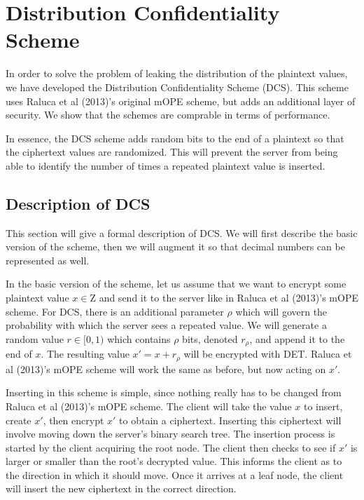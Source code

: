 \documentclass[12pt]{article}
\begin{document}
\section{Distribution Confidentiality Scheme}

In order to solve the problem of leaking the distribution of the plaintext values, we have developed the Distribution Confidentiality Scheme (DCS). This scheme uses Raluca et al (2013)'s original mOPE scheme, but adds an additional layer of security. We show that the schemes are comprable in terms of performance.

In essence, the DCS scheme adds random bits to the end of a plaintext so that the ciphertext values are randomized. This will prevent the server from being able to identify the number of times a repeated plaintext value is inserted.

\subsection{Description of DCS}

This section will give a formal description of DCS. We will first describe the basic version of the scheme, then we will augment it so that decimal numbers can be represented as well.

In the basic version of the scheme, let us assume that we want to encrypt some plaintext value $x \in \mathrm{Z}$ and send it to the server like in Raluca et al (2013)'s mOPE scheme. For DCS, there is an additional parameter $\rho$ which will govern the probability with which the server sees a repeated value. We will generate a random value $r \in [0,1)$ which contains $\rho$ bits, denoted $r_{\rho}$, and append it to the end of $x$. The resulting value $x' = x + r_{\rho}$ will be encrypted with DET. Raluca et al (2013)'s mOPE scheme will work the same as before, but now acting on $x'$.

Inserting in this scheme is simple, since nothing really has to be changed from Raluca et al (2013)'s mOPE scheme. The client will take the value $x$ to insert, create $x'$, then encrypt $x'$ to obtain a ciphertext. Inserting this ciphertext will involve moving down the server's binary search tree. The insertion process is started by the client acquiring the root node. The client then checks to see if $x'$ is larger or smaller than the root's decrypted value. This informs the client as to the direction in which it should move. Once it arrives at a leaf node, the client will insert the new ciphertext in the correct direction.
\end{document}
